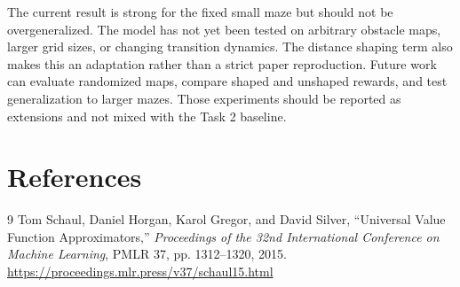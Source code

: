 \documentclass[11pt,a4paper]{article}
\begin{document}
The current result is strong for the fixed small maze but should not be
overgeneralized. The model has not yet been tested on arbitrary obstacle maps,
larger grid sizes, or changing transition dynamics. The distance shaping term
also makes this an adaptation rather than a strict paper reproduction. Future
work can evaluate randomized maps, compare shaped and unshaped rewards, and
test generalization to larger mazes. Those experiments should be reported as
extensions and not mixed with the Task 2 baseline.

\section{References}

\begin{thebibliography}{9}
Tom Schaul, Daniel Horgan, Karol Gregor, and David Silver,
``Universal Value Function Approximators,''
\emph{Proceedings of the 32nd International Conference on Machine Learning},
PMLR 37, pp. 1312--1320, 2015.
\url{https://proceedings.mlr.press/v37/schaul15.html}
\end{thebibliography}
\end{document}
